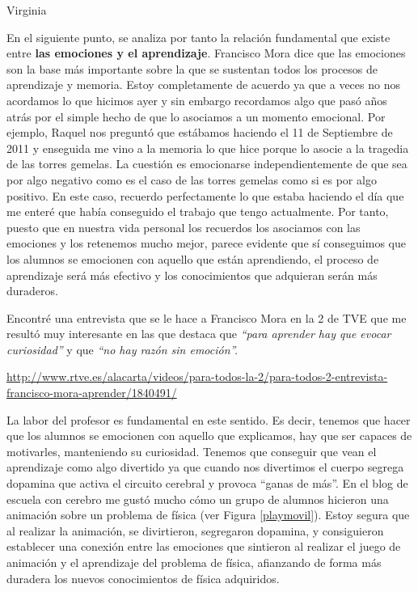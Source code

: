 \begin{opin}{\virgicolor}{Virginia}

En el siguiente punto, se analiza por tanto la relación fundamental que existe entre \textbf{las emociones y el aprendizaje}.  Francisco Mora dice que las emociones son la base más importante sobre la que se sustentan todos los procesos de aprendizaje y memoria. Estoy completamente de acuerdo ya que a veces no nos acordamos lo que hicimos ayer y sin embargo recordamos algo que pasó años atrás por el simple hecho de que lo asociamos a un momento emocional. Por ejemplo, Raquel nos preguntó que estábamos haciendo el 11 de Septiembre de 2011 y enseguida me vino a la memoria lo que hice porque lo asocie a la tragedia de las torres gemelas. La cuestión es emocionarse independientemente de que sea por algo negativo como es el caso de las torres gemelas como si es por algo positivo. En este caso, recuerdo perfectamente lo que estaba haciendo el día que me enteré que había conseguido el trabajo que tengo actualmente. Por tanto, puesto que en nuestra vida personal los recuerdos los asociamos con las emociones y los retenemos mucho mejor, parece evidente que sí conseguimos que los alumnos se emocionen con aquello que están aprendiendo, el proceso de aprendizaje será más efectivo y los conocimientos que adquieran serán más duraderos.

Encontré una entrevista que se le hace a Francisco Mora en la 2 de TVE que me resultó muy interesante en las que destaca que \textit{“para aprender hay que evocar curiosidad”} y que \textit{“no hay razón sin emoción”.}

\url{http://www.rtve.es/alacarta/videos/para-todos-la-2/para-todos-2-entrevista-francisco-mora-aprender/1840491/}

La labor del profesor es fundamental en este sentido. Es decir, tenemos que hacer que los alumnos se emocionen con aquello que explicamos, hay que ser capaces de motivarles, manteniendo su curiosidad. Tenemos que conseguir que vean el aprendizaje como algo divertido ya que cuando nos divertimos el cuerpo segrega dopamina que activa el circuito cerebral y provoca “ganas de más”. En el blog de escuela con cerebro me gustó mucho cómo un grupo de alumnos hicieron una animación sobre un problema de física (ver Figura \ref{playmovil}). Estoy segura que al realizar la animación, se divirtieron, segregaron dopamina, y consiguieron establecer una conexión entre las emociones que sintieron al realizar el juego de animación y el aprendizaje del problema de física, afianzando de forma más duradera los nuevos conocimientos de física adquiridos.




\end{opin}
